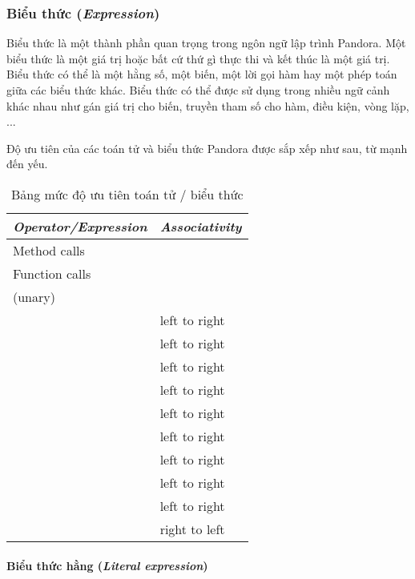 \subsubsection{Biểu thức (\textit{Expression})}

\regexexpr

Biểu thức là một thành phần quan trọng trong ngôn ngữ lập trình Pandora. Một biểu thức là một giá trị hoặc bất cứ thứ gì thực thi và kết thúc là một giá trị. Biểu thức có thể là một hằng số, một biến, một lời gọi hàm hay một phép toán giữa các biểu thức khác. Biểu thức có thể được sử dụng trong nhiều ngữ cảnh khác nhau như gán giá trị cho biến, truyền tham số cho hàm, điều kiện, vòng lặp, ...

Độ ưu tiên của các toán tử và biểu thức Pandora được sắp xếp như sau, từ mạnh đến yếu. 

\begin{longtable}{| l | l |}
    \caption{Bảng mức độ ưu tiên toán tử / biểu thức} \\
\hline
\textbf{\textit{Operator/Expression}} & \textbf{\textit{Associativity}} \\
\hline
Method calls & \\
\hline
Function calls & \\
\hline
\w{$-$}(unary) \w{$*$} \w{$!$} & \\
\hline
\w{$*$} \w{$/$} \w{$\%$} & left to right \\
\hline
\w{$+$} \w{$-$} & left to right \\
\hline
\w{$<<$} \w{$>>$} & left to right \\
\hline
\w{$\&$} & left to right \\
\hline
\w{$\wedge$} & left to right \\
\hline
\w{$|$} & left to right \\
\hline
\w{$==$} \w{$!=$} \w{$<$} \w{$>$} \w{$<=$} \w{$>=$} & left to right \\
\hline
\w{$\&\&$} & left to right \\
\hline
\w{$||$} & left to right \\
\hline
\w{$=$} \w{$+=$} \w{$-=$} \w{$*=$} \w{$/=$} \w{$\%=$} \w{$<<=$} \w{$>>=$} \w{$\&=$} \w{$\wedge=$} \w{$|=$} & right to left \\
\hline
\end{longtable}

\paragraph{Biểu thức hằng (\textit{Literal expression})}

